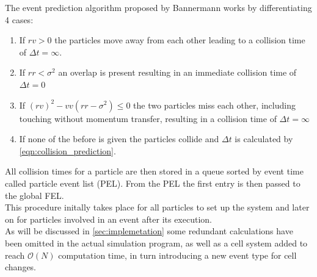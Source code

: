 
The event prediction algorithm proposed by Bannermann\cite{Bannerman2014} works by differentiating 4 cases:
\begin{enumerate}
\item If $rv>0$ the particles move away from each other leading to a collision time of $\Delta t = \infty$.
\item If $rr<\sigma^2$ an overlap is present resulting in an immediate collision time of $\Delta t = 0$
\item If $(rv)^2  - vv (rr - \sigma^2 ) \leq 0 $ the two particles miss each other, including touching without momentum transfer, resulting in a collision time of $\Delta t = \infty$
\item If none of the before is given the particles collide and $\Delta t$ is calculated by \autoref{eqn:collision_prediction}.
\end{enumerate}

All collision times for a particle are then stored in a queue sorted by event time called particle event list (PEL). From the PEL the first entry is then passed to the global FEL.\\
This procedure initally takes place for all particles to set up the system and later on for particles involved in an event after its execution.\\ 

As will be discussed in \autoref{sec:implemetation} some redundant calculations have been omitted in the actual simulation program, as well as a cell system added to reach $\mathcal{O}(N)$ computation time, in turn introducing a new event type for cell changes.\\

